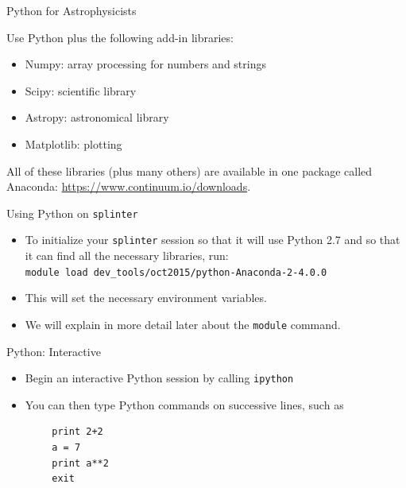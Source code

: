 \documentclass{beamer}
\begin{document}
\begin{frame}{Python for Astrophysicists}
  \begin{block}{Use Python plus the following add-in libraries:}
    \begin{itemize}
      \item Numpy: array processing for numbers and strings
      \item Scipy: scientific library
      \item Astropy: astronomical library
      \item Matplotlib: plotting
    \end{itemize}
  \end{block}
  \begin{block}{All of these libraries (plus many others) are available in one package called Anaconda:}
    \url{https://www.continuum.io/downloads}.
  \end{block}
\end{frame}

\begin{frame}{Using Python on \texttt{splinter}}
  \begin{itemize}
    \item To initialize your \texttt{splinter} session so that it will use Python 2.7 and so that it can find all the necessary libraries, run: \\
    \alert{\texttt{module~load~dev\_tools/oct2015/python-Anaconda-2-4.0.0}}
    \item This will set the necessary environment variables.
    \item We will explain in more detail later about the \texttt{module} command.
  \end{itemize}
\end{frame}

\begin{frame}[fragile]{Python: Interactive}
  \begin{itemize}
    \item Begin an interactive Python session by calling \alert{\texttt{ipython}}
    \item You can then type Python commands on successive lines, such as
  \end{itemize}
  \begin{lstlisting}
        print 2+2
        a = 7
        print a**2
        exit
  \end{lstlisting}
\end{frame}
\end{document}
